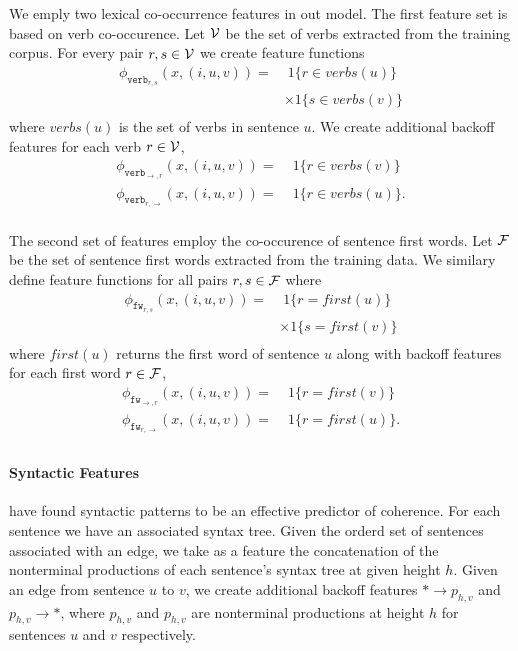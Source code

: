 \documentclass[11pt]{article}
\newcommand{\Verbs}{\cal V}
\newcommand{\Fwords}{\cal F}
\begin{document}
We emply two lexical co-occurrence features in out model. The first feature set is based on verb co-occurence. Let $\Verbs$ be the set of verbs extracted from the training corpus. For every pair $r,s \in \Verbs$ we create feature functions 
\begin{align*}
\phi_{\texttt{verb}_{r,s}}(x, (i, u, v)) = & \; 1\{ r \in verbs(u) \} \\
& \times 1\{s \in verbs(v) \}\\
\end{align*}
where $verbs(u)$ is the set of verbs in sentence $u$.
We create additional backoff features for each verb $r \in \Verbs$,
\begin{align*}
\phi_{\texttt{verb}_{\rightarrow,r}}(x, (i, u, v)) = & \; 1\{ r \in verbs(v)\} \\
\phi_{\texttt{verb}_{r,\rightarrow}}(x, (i, u, v)) = & \; 1\{ r \in verbs(u)\}. \\
\end{align*}


The second set of features employ the co-occurence of sentence first words.
Let $\Fwords$ be the set of sentence first words extracted from the training data.
 We similary define feature functions for all pairs $r,s \in \Fwords$ where
\begin{align*}
\phi_{\texttt{fw}_{r,s}}(x, (i, u, v)) = & \; 1\{ r = first(u) \} \\
& \times 1\{s = first(v) \}\\
\end{align*}
where $first(u)$ returns the first word of sentence $u$ along with backoff features for each first word $r \in \Fwords$,
\begin{align*}
\phi_{\texttt{fw}_{\rightarrow,r}}(x, (i, u, v)) = & \; 1\{ r = first(v)\} \\
\phi_{\texttt{fw}_{r,\rightarrow}}(x, (i, u, v)) = & \; 1\{ r = first(u)\}. \\
\end{align*}



\paragraph{Syntactic Features}

 have found syntactic patterns to be an effective predictor of coherence. For each sentence we have an associated syntax tree. Given the orderd set of sentences associated with an edge, we take as a feature the concatenation of the nonterminal productions of each sentence's syntax tree at given height $h$. Given an edge from sentence $u$ to $v$, we create additional backoff features $* \rightarrow p_{h,v}$ and $p_{h,v} \rightarrow *$, where $p_{h,v}$ and $p_{h,v} $ are nonterminal productions at height $h$ for sentences $u$ and $v$ respectively.
\end{document}
